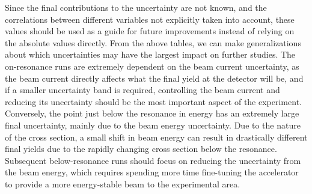 Since the final contributions to the uncertainty are not known, and the
correlations between different variables not explicitly taken into
account, these values should be used as a guide for future improvements
instead of relying on the absolute values directly. From the above
tables, we can make generalizations about which uncertainties may have
the largest impact on further studies. The on-resonance runs are
extremely dependent on the beam current uncertainty, as the beam current
directly affects what the final yield at the detector will be, and if a
smaller uncertainty band is required, controlling the beam current and
reducing its uncertainty should be the most important aspect of the
experiment. Conversely, the point just below the resonance in energy has
an extremely large final uncertainty, mainly due to the beam energy
uncertainty. Due to the nature of the cross section, a small shift in
beam energy can result in drastically different final yields due to the
rapidly changing cross section below the resonance. Subsequent
below-resonance runs should focus on reducing the uncertainty from the
beam energy, which requires spending more time fine-tuning the
accelerator to provide a more energy-stable beam to the experimental
area.

